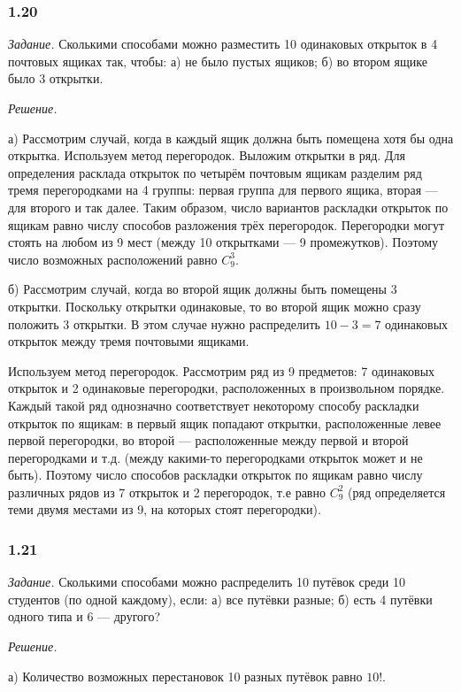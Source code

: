 \documentclass{book}
\begin{document}
\subsubsection*{1.20}

\textit{Задание.} Сколькими способами можно разместить 10 одинаковых открыток в 4 почтовых ящиках так, чтобы: а) не было пустых ящиков; б) во втором ящике было 3 открытки.

\textit{Решение.}

а) Рассмотрим случай, когда в каждый ящик должна быть помещена хотя бы одна открытка. Используем метод перегородок. Выложим открытки в ряд. Для определения расклада открыток по четырём почтовым ящикам разделим ряд тремя перегородками на 4 группы: первая группа для первого ящика, вторая --- для второго и так далее. Таким образом, число вариантов раскладки открыток по ящикам равно числу способов разложения трёх перегородок. Перегородки могут стоять на любом из 9 мест (между 10 открытками --- 9 промежутков). Поэтому число возможных расположений равно $C_9^3$.

б) Рассмотрим случай, когда во второй ящик должны быть помещены 3 открытки. Поскольку открытки одинаковые, то во второй ящик можно сразу положить 3 открытки. В этом случае нужно распределить $10-3=7$ одинаковых открыток между тремя почтовыми ящиками.

Используем метод перегородок. Рассмотрим ряд из 9 предметов: 7 одинаковых открыток и 2 одинаковые перегородки, расположенных в произвольном порядке. Каждый такой ряд однозначно соответствует некоторому способу раскладки открыток по ящикам: в первый ящик попадают открытки, расположенные левее первой перегородки, во второй --- расположенные между первой и второй перегородками и т.д. (между какими-то перегородками открыток может и не быть). Поэтому число способов раскладки открыток по ящикам равно числу различных рядов из 7 открыток и 2 перегородок, т.е равно $C_9^2$ (ряд определяется теми двумя местами из 9, на которых стоят перегородки).

\subsubsection*{1.21}

\textit{Задание.} Сколькими способами можно распределить 10 путёвок среди 10 студентов (по одной каждому), если: а) все путёвки разные; б) есть 4 путёвки одного типа и 6 --- другого?

\textit{Решение.}

а) Количество возможных перестановок 10 разных путёвок равно $10!$.
\end{document}
